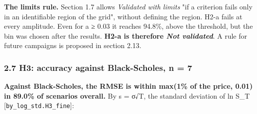 \documentclass[
  10pt,
]{article}
\begin{document}
\textbf{The limits rule.} Section 1.7 allows \emph{Validated with
limits} "if a criterion fails only in an identifiable region of the
grid", without defining the region. H2-a fails at every amplitude. Even
for a ≥ 0.03 it reaches 94.8\%, above the threshold, but the bin was
chosen after the results. \textbf{H2-a is therefore \emph{Not
validated}}. A rule for future campaigns is proposed in section 2.13.

\hypertarget{27-h3-accuracy-against-black-scholes-n--7}{%
\subsubsection{2.7 H3: accuracy against Black-Scholes, n =
7}\label{27-h3-accuracy-against-black-scholes-n--7}}

\textbf{Against Black-Scholes, the RMSE is within max(1\% of the price,
0.01) in 89.0\% of scenarios overall.} By s = σ√T, the standard
deviation of ln S\_T {[}\texttt{by\_log\_std.H3\_fine}{]}:
\end{document}
